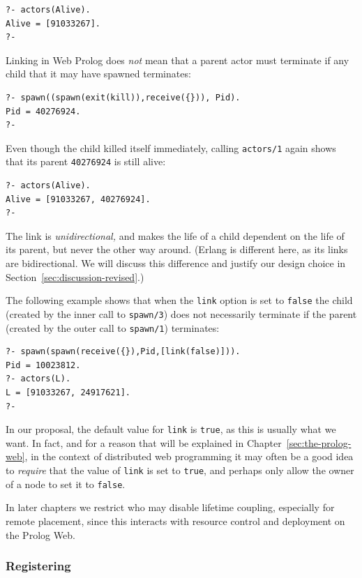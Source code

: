 \begin{verbatim}
?- actors(Alive).
Alive = [91033267].
?-
\end{verbatim}

\noindent Linking in Web Prolog does \textit{not} mean that a parent actor must terminate if any child that it may have spawned terminates:

\begin{verbatim}
?- spawn((spawn(exit(kill)),receive({})), Pid).
Pid = 40276924.
?-
\end{verbatim}

\noindent Even though the child killed itself immediately, calling \texttt{actors/1} again shows that its parent \texttt{40276924} is still alive:

\begin{verbatim}
?- actors(Alive).
Alive = [91033267, 40276924].
?-
\end{verbatim}

\noindent The link is \textit{unidirectional,} and makes the life of a child dependent on the life of its parent, but never the other way around. (Erlang is different here, as its links are bidirectional. We will discuss this difference and justify our design choice in Section~\ref{sec:discussion-revised}.)

The following example shows that when the \texttt{link} option is set to \texttt{false} the child (created by the inner call to \texttt{spawn/3}) does not necessarily terminate if the parent (created by the outer call to \texttt{spawn/1}) terminates:

\begin{verbatim}
?- spawn(spawn(receive({}),Pid,[link(false)])).
Pid = 10023812.
?- actors(L).
L = [91033267, 24917621].
?-
\end{verbatim}

\noindent In our proposal, the default value for \texttt{link} is \texttt{true}, as this is usually what we want. In fact, and for a reason that will be explained in Chapter~\ref{sec:the-prolog-web}, in the context of distributed web programming it may often be a good idea to \textit{require} that the value of \texttt{link} is set to \texttt{true}, and perhaps only allow the owner of a node to set it to \texttt{false}. 

In later chapters we restrict who may disable lifetime coupling, especially for remote placement, since this interacts with resource control and deployment on the Prolog Web.

\subsubsection{Registering}

